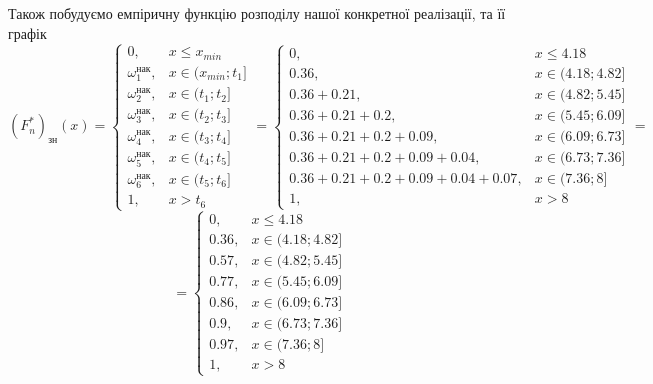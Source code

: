 \documentclass[11 pt]{article}
\begin{document}
\newpage
Також побудуємо емпіричну функцію розподілу нашої конкретної реалізації, та її графік
\\ 
$$
\left(F^*_{n}\right)_{\text{зн}}(x) = 
\begin{cases}
    0, & x \le x_{min} \\
    \omega_1^{\text{нак}}, & x \in (x_{min}; t_1 ] \\ 
    \omega_2^{\text{нак}}, & x \in (t_1; t_2  ] \\ 
    \omega_3^{\text{нак}}, & x \in (t_2 ; t_3 ] \\ 
    \omega_4^{\text{нак}}, & x \in (t_3 ; t_4 ] \\ 
    \omega_5^{\text{нак}}, & x \in (t_4; t_5 ] \\ 
    \omega_6^{\text{нак}}, & x \in (t_5; t_6 ] \\ 
    1, & x > t_6 
\end{cases}
=
\begin{cases}
    0, & x \le 4.18 \\
    0.36, & x \in (4.18; 4.82 ] \\ 
    0.36+0.21, & x \in (4.82; 5.45  ] \\ 
    0.36+0.21+0.2, & x \in (5.45 ; 6.09 ] \\ 
    0.36+0.21+0.2+0.09, & x \in (6.09 ; 6.73 ] \\ 
    0.36+0.21+0.2+0.09+0.04, & x \in (6.73 ; 7.36 ] \\ 
    0.36+0.21+0.2+0.09+0.04+0.07, & x \in (7.36; 8 ] \\  
    1, & x > 8
\end{cases}
=
$$
$$
=
\begin{cases}
    0, & x \le 4.18 \\
    0.36, & x \in (4.18; 4.82 ] \\ 
    0.57, & x \in (4.82; 5.45  ] \\ 
    0.77, & x \in (5.45 ; 6.09 ] \\ 
    0.86, & x \in (6.09 ; 6.73 ] \\ 
    0.9, & x \in (6.73 ; 7.36 ] \\ 
    0.97, & x \in (7.36; 8 ] \\  
    1, & x > 8
\end{cases}
$$ \\
\end{document}
